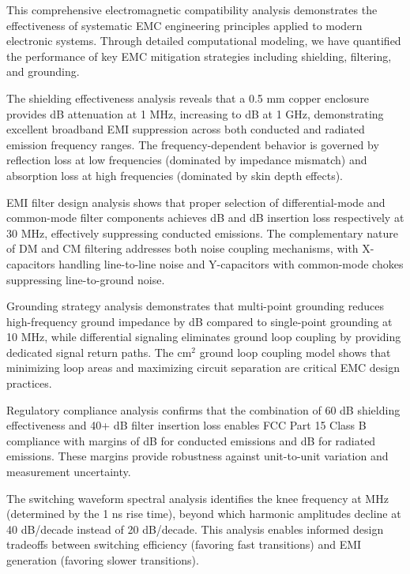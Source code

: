 \documentclass[11pt,a4paper]{article}
\begin{document}
This comprehensive electromagnetic compatibility analysis demonstrates the effectiveness of systematic EMC engineering principles applied to modern electronic systems. Through detailed computational modeling, we have quantified the performance of key EMC mitigation strategies including shielding, filtering, and grounding.

The shielding effectiveness analysis reveals that a 0.5 mm copper enclosure provides  dB attenuation at 1 MHz, increasing to  dB at 1 GHz, demonstrating excellent broadband EMI suppression across both conducted and radiated emission frequency ranges. The frequency-dependent behavior is governed by reflection loss at low frequencies (dominated by impedance mismatch) and absorption loss at high frequencies (dominated by skin depth effects).

EMI filter design analysis shows that proper selection of differential-mode and common-mode filter components achieves  dB and  dB insertion loss respectively at 30 MHz, effectively suppressing conducted emissions. The complementary nature of DM and CM filtering addresses both noise coupling mechanisms, with X-capacitors handling line-to-line noise and Y-capacitors with common-mode chokes suppressing line-to-ground noise.

Grounding strategy analysis demonstrates that multi-point grounding reduces high-frequency ground impedance by  dB compared to single-point grounding at 10 MHz, while differential signaling eliminates ground loop coupling by providing dedicated signal return paths. The  cm$^2$ ground loop coupling model shows that minimizing loop areas and maximizing circuit separation are critical EMC design practices.

Regulatory compliance analysis confirms that the combination of 60 dB shielding effectiveness and 40+ dB filter insertion loss enables FCC Part 15 Class B compliance with margins of  dB for conducted emissions and  dB for radiated emissions. These margins provide robustness against unit-to-unit variation and measurement uncertainty.

The switching waveform spectral analysis identifies the knee frequency at  MHz (determined by the 1 ns rise time), beyond which harmonic amplitudes decline at 40 dB/decade instead of 20 dB/decade. This analysis enables informed design tradeoffs between switching efficiency (favoring fast transitions) and EMI generation (favoring slower transitions).
\end{document}
